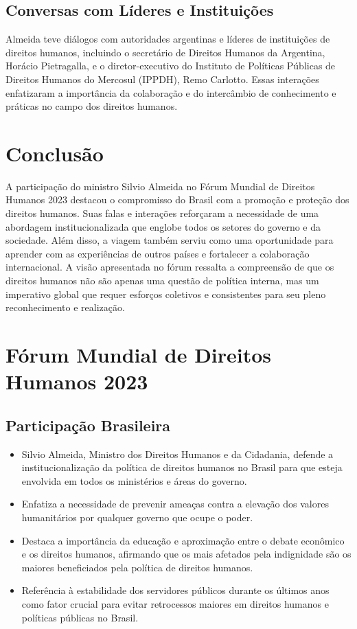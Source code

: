 \documentclass[
   article,       
   12pt,          
   oneside,       
   a4paper,       
   english,       
   brazil,        
   sumario=tradicional
   ]{abntex2}
\begin{document}
\subsection{Conversas com Líderes e Instituições}
Almeida teve diálogos com autoridades argentinas e líderes de instituições de direitos humanos, incluindo o secretário de Direitos Humanos da Argentina, Horácio Pietragalla, e o diretor-executivo do Instituto de Políticas Públicas de Direitos Humanos do Mercosul (IPPDH), Remo Carlotto. Essas interações enfatizaram a importância da colaboração e do intercâmbio de conhecimento e práticas no campo dos direitos humanos.

\section{Conclusão}
A participação do ministro Silvio Almeida no Fórum Mundial de Direitos Humanos 2023 destacou o compromisso do Brasil com a promoção e proteção dos direitos humanos. Suas falas e interações reforçaram a necessidade de uma abordagem institucionalizada que englobe todos os setores do governo e da sociedade. Além disso, a viagem também serviu como uma oportunidade para aprender com as experiências de outros países e fortalecer a colaboração internacional. A visão apresentada no fórum ressalta a compreensão de que os direitos humanos não são apenas uma questão de política interna, mas um imperativo global que requer esforços coletivos e consistentes para seu pleno reconhecimento e realização.
\section{Fórum Mundial de Direitos Humanos 2023}
\subsection{Participação Brasileira}
\begin{itemize}
    \item Silvio Almeida, Ministro dos Direitos Humanos e da Cidadania, defende a institucionalização da política de direitos humanos no Brasil para que esteja envolvida em todos os ministérios e áreas do governo.
    \item Enfatiza a necessidade de prevenir ameaças contra a elevação dos valores humanitários por qualquer governo que ocupe o poder.
    \item Destaca a importância da educação e aproximação entre o debate econômico e os direitos humanos, afirmando que os mais afetados pela indignidade são os maiores beneficiados pela política de direitos humanos.
    \item Referência à estabilidade dos servidores públicos durante os últimos anos como fator crucial para evitar retrocessos maiores em direitos humanos e políticas públicas no Brasil.
\end{itemize}
\end{document}

